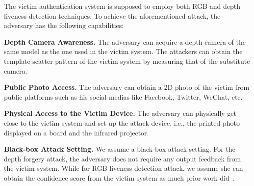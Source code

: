 The victim authentication system is supposed to employ both RGB and depth liveness detection techniques. To achieve the aforementioned attack, the adversary has the following capabilities:

\textbf{Depth Camera Awareness.}
The adversary can acquire a depth camera of the same model as the one used in the victim system. The attackers can obtain the template scatter pattern of the victim system by measuring that of the substitute camera.


\textbf{Public Photo Access.}
The adversary can obtain a  2D photo of the victim from  public platforms such as his social medias like Facebook, Twitter, WeChat, etc.

\textbf{Physical Access to the Victim Device.} The adversary can physically get close to the victim system and set up the attack device, i.e., the printed photo displayed on a board and the infrared projector.


\textbf{Black-box Attack Setting.} 
We assume a black-box attack setting. For the depth forgery attack, the adversary does not require any output feedback from the victim system. While for RGB liveness detection attack, we assume she can obtain the  confidence score from the victim system as much prior work did~\cite{guo2019simple}.



